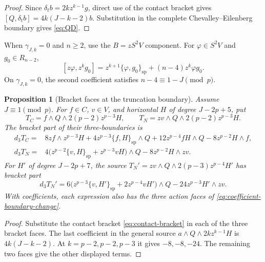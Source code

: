 \documentclass[11pt]{article}
\theoremstyle{plain}
\newtheorem{proposition}[proposition]{Proposition}
\theoremstyle{definition}
\theoremstyle{remark}
\numberwithin{equation}{section}
\newcommand{\spb}{\mathrm{sp}}
\begin{document}
\begin{proof}
Since $\delta_tb=2kz^{k-1}g$, direct use of the contact bracket gives
$[Q,\delta_tb]=4k(J-k-2)b$.  Substitution in the complete
Chevalley--Eilenberg boundary gives \eqref{eq:QD}.
\end{proof}

When $\gamma_{J,k}=0$ and $n\ge2$, use the $B=zS^2V$ component.  For
$\varphi\in S^2V$ and $g_0\in R_{n-2}$,
\begin{equation}\label{eq:B-crossing}
 {[z\varphi,z^kg_0]}
 =z^{k+1}\{\varphi,g_0\}_{\spb}+(n-4)z^k\varphi g_0.
\end{equation}
On $\gamma_{J,k}=0$, the second coefficient satisfies
$n-4\equiv1-J\pmod p$.

\begin{proposition}[Bracket faces at the truncation boundary]\label{thm:higher-contraction}
Assume $J\equiv1\pmod p$. For $f\in C$, $v\in V$, and
horizontal $H$ of degree $J-2p+5$, put
\[
 T_C=f\wedge Q\wedge2(p-2)z^{p-3}H,\qquad
 T_N=zv\wedge Q\wedge2(p-2)z^{p-3}H.
\]
The bracket part of their three-boundaries is
\begin{align*}
 d_3T_C={}&8zf\wedge z^{p-3}H
 +4z^{p-3}\{f,H\}_{\spb}\wedge Q
 +12z^{p-4}fH\wedge Q-8z^{p-2}H\wedge f,\\
 d_3T_N={}&4\bigl(z^{p-2}\{v,H\}_{\spb}+z^{p-3}vH\bigr)\wedge Q
                  -8z^{p-2}H\wedge zv.
\end{align*}
For $H'$ of degree $J-2p+7$, the source
$T_N'=zv\wedge Q\wedge2(p-3)z^{p-4}H'$ has bracket part
\[
 d_3T_N'=6\bigl(z^{p-3}\{v,H'\}_{\spb}
                    +2z^{p-4}vH'\bigr)\wedge Q
                  -24z^{p-3}H'\wedge zv.
\]
With coefficients, each expression also has the three action faces
of \eqref{eq:coefficient-boundary-change}.
\end{proposition}
\begin{proof}
Substitute the contact bracket \eqref{eq:contact-bracket} in each
of the three bracket faces. The last coefficient in the general source
$a\wedge Q\wedge2kz^{k-1}H$ is $4k(J-k-2)$.
At $k=p-2,p-2,p-3$ it gives $-8,-8,-24$.
The remaining two faces give the other displayed terms.
\end{proof}
\end{document}
